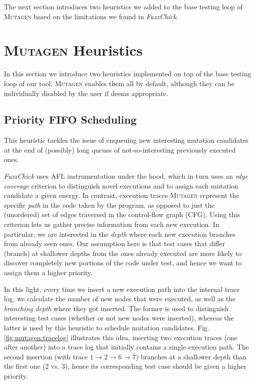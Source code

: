 \documentclass[acmsmall, anonymous]{acmart}
\newcommand{\fuzzchick}{\textit{FuzzChick}\xspace}
\newcommand{\mutagen}{\textsc{Mutagen}\xspace}
\begin{document}
The next section introduces two heuristics we added to the base testing loop of
\mutagen based on the limitations we found in \fuzzchick.
%


\section{\mutagen Heuristics}
\label{sec:heuristics}

In this section we introduce two heuristics implemented on top of the base
testing loop of our tool.
%
\mutagen enables them all by default, although they can be individually disabled
by the user if deems appropriate.

\subsection{Priority FIFO Scheduling}

This heuristic tackles the issue of enqueuing new interesting mutation
candidates at the end of (possibly) long queues of not-so-interesting previously
executed ones.

\fuzzchick uses AFL instrumentation under the hood, which in turn uses an
\emph{edge coverage} criterion to distinguish novel executions and to assign
each mutation candidate a given energy.
%
In contrast, execution traces \mutagen represent the specific \emph{path} in the
code taken by the program, as opposed to just the (unordered) set of edges
traversed in the control-flow graph (CFG).
%
Using this criterion lets us gather precise information from each new execution.
%
In particular, we are interested in the \emph{depth} where each new execution
branches from already seen ones.
%
Our assumption here is that test cases that differ (branch) at shallower depths
from the ones already executed are more likely to discover completely new
portions of the code under test, and hence we want to assign them a higher
priority.


In this light, every time we insert a new execution path into the internal trace
log, we calculate the number of new nodes that were executed, as well as the
\emph{branching depth} where they got inserted.
%
The former is used to distinguish interesting test cases (whether or not new
nodes were inserted), whereas the latter is used by this heuristic to schedule
mutation candidates.
%
Fig. \ref{fig:mutagen:tracelog} illustrates this idea, inserting two execution
traces (one after another) into a trace log that initially contains a single
execution path.
%
The second insertion (with trace $1 \rightarrow 2 \rightarrow 6 \rightarrow 7$)
branches at a shallower depth than the first one (2 vs. 3), hence its
corresponding test case should be given a higher priority.
\end{document}
